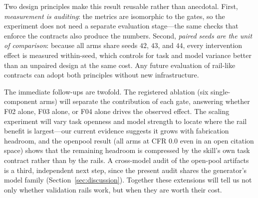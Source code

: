 \documentclass[10pt,twocolumn]{article}
\begin{document}
Two design principles make this result reusable rather than anecdotal. First, \emph{measurement is auditing}: the metrics are isomorphic to the gates, so the experiment does not need a separate evaluation stage---the same checks that enforce the contracts also produce the numbers. Second, \emph{paired seeds are the unit of comparison}: because all arms share seeds $42$, $43$, and $44$, every intervention effect is measured within-seed, which controls for task and model variance better than an unpaired design at the same cost. Any future evaluation of rail-like contracts can adopt both principles without new infrastructure.

The immediate follow-ups are twofold. The registered ablation (six single-component arms) will separate the contribution of each gate, answering whether F02 alone, F03 alone, or F04 alone drives the observed effect. The scaling experiment will vary task openness and model strength to locate where the rail benefit is largest---our current evidence suggests it grows with fabrication headroom, and the openpool result (all arms at CFR $0.0$ even in an open citation space) shows that the remaining headroom is compressed by the skill's own task contract rather than by the rails. A cross-model audit of the open-pool artifacts is a third, independent next step, since the present audit shares the generator's model family (Section~\ref{sec:discussion}). Together these extensions will tell us not only whether validation rails work, but when they are worth their cost.



\end{document}
